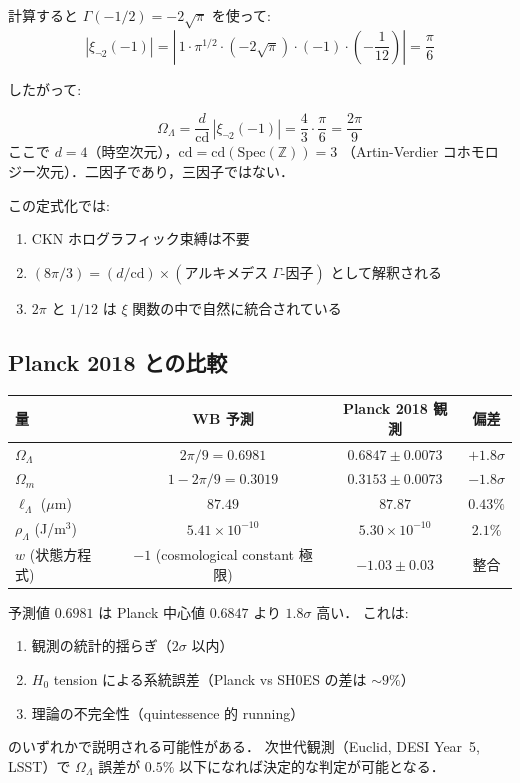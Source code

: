 計算すると $\Gamma(-1/2) = -2\sqrt{\pi}$ を使って:
\begin{equation}
|\xi_{\neg 2}(-1)| = \left|\,1\cdot\pi^{1/2}\cdot(-2\sqrt{\pi})\cdot(-1)\cdot\left(-\frac{1}{12}\right)\right|
= \frac{\pi}{6}
\end{equation}

したがって:
\begin{keyresult}
\begin{equation}
\Omega_\Lambda = \frac{d}{\mathrm{cd}}\,|\xi_{\neg 2}(-1)|
= \frac{4}{3}\cdot\frac{\pi}{6}
= \frac{2\pi}{9}
\end{equation}
ここで $d = 4$（時空次元），$\mathrm{cd} = \mathrm{cd}(\mathrm{Spec}(\mathbb{Z})) = 3$
（Artin-Verdier コホモロジー次元）．二因子であり，三因子ではない．
\end{keyresult}

この定式化では:
\begin{enumerate}
\item CKN ホログラフィック束縛は不要
\item $(8\pi/3) = (d/\mathrm{cd}) \times (\text{アルキメデス}\;\Gamma\text{-因子})$ として解釈される
\item $2\pi$ と $1/12$ は $\xi$ 関数の中で自然に統合されている
\end{enumerate}

\subsection{Planck 2018 との比較}

\begin{center}
\begin{tabular}{lccc}
\toprule
量 & WB 予測 & Planck 2018 観測 & 偏差 \\
\midrule
$\Omega_\Lambda$ & $2\pi/9 = 0.6981$ & $0.6847 \pm 0.0073$ & $+1.8\sigma$ \\
$\Omega_m$ & $1 - 2\pi/9 = 0.3019$ & $0.3153 \pm 0.0073$ & $-1.8\sigma$ \\
$\ell_\Lambda$ ($\mu$m) & $87.49$ & $87.87$ & $0.43\%$ \\
$\rho_\Lambda$ (J/m$^3$) & $5.41\times10^{-10}$ & $5.30\times10^{-10}$ & $2.1\%$ \\
$w$ (状態方程式) & $-1$ (cosmological constant 極限) & $-1.03 \pm 0.03$ & 整合 \\
\bottomrule
\end{tabular}
\end{center}

\begin{warningbox}[注意: 2\% のずれの解釈]
予測値 $0.6981$ は Planck 中心値 $0.6847$ より $1.8\sigma$ 高い．
これは:
\begin{enumerate}
\item 観測の統計的揺らぎ（$2\sigma$ 以内）
\item $H_0$ tension による系統誤差（Planck vs SH0ES の差は $\sim9\%$）
\item 理論の不完全性（quintessence 的 running）
\end{enumerate}
のいずれかで説明される可能性がある．
次世代観測（Euclid, DESI Year~5, LSST）で $\Omega_\Lambda$ 誤差が
$0.5\%$ 以下になれば決定的な判定が可能となる．
\end{warningbox}

